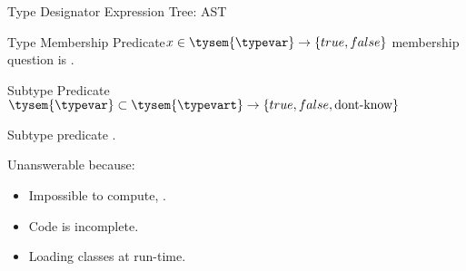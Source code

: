 \begin{frame}{Type Designator Expression Tree: AST}
  \centering

  \scalebox{0.95}{}

\end{frame}



\newsavebox\membershipbox
\begin{lrbox}{\membershipbox}
  \begin{minipage}{11cm}
    
  \end{minipage}
\end{lrbox}

\begin{frame}{Type Membership Predicate}{$x \in \tysem{\typevar} \to \{true, false\}$}
   membership question is .

  \usebox\membershipbox
\end{frame}

\newsavebox\subtypebox
\begin{lrbox}{\subtypebox}
  \begin{minipage}{11cm}

  \end{minipage}
\end{lrbox}



\begin{frame}{Subtype Predicate}{$\tysem{\typevar}\subset\tysem{\typevart} \to \{true,false,\text{dont-know}\}$}

   Subtype predicate .

  \usebox\subtypebox

  Unanswerable because:
  \begin{itemize}
  \item Impossible to compute, \eg {}.
  \item Code is incomplete.
  \item Loading classes at run-time.
  \end{itemize}

\end{frame}

